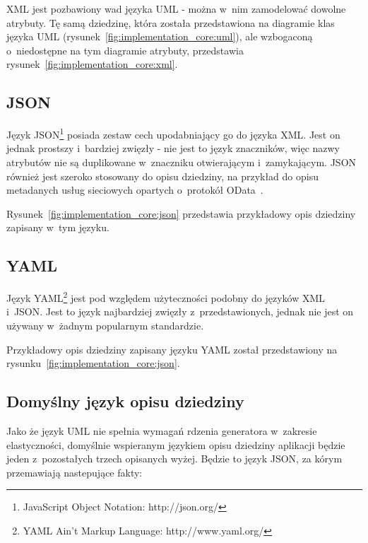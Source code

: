 XML jest pozbawiony wad języka UML - można w~nim zamodelować dowolne atrybuty.
Tę samą dziedzinę, która została przedstawiona na diagramie klas języka UML (rysunek~\ref{fig:implementation_core:uml}), ale wzbogaconą o~niedostępne na tym diagramie atrybuty, przedstawia rysunek~\ref{fig:implementation_core:xml}.




\subsection{JSON}

Język JSON\footnote{JavaScript Object Notation: http://json.org/} posiada zestaw cech upodabniający go do języka XML.
Jest on jednak prostszy i~bardziej zwięzły - nie jest to język znaczników, więc nazwy atrybutów nie są duplikowane w~znaczniku otwierającym i~zamykającym.
JSON również jest szeroko stosowany do opisu dziedziny, na przykład do opisu metadanych usług sieciowych opartych o~protokół OData~\cite{odata}.

Rysunek~\ref{fig:implementation_core:json} przedstawia przykładowy opis dziedziny zapisany w~tym języku.




\subsection{YAML}

Język YAML\footnote{YAML Ain't Markup Language: http://www.yaml.org/} jest pod względem użyteczności podobny do języków XML i~JSON.
Jest to język najbardziej zwięzły z~przedstawionych, jednak nie jest on używany w~żadnym popularnym standardzie.

Przykładowy opis dziedziny zapisany języku YAML został przedstawiony na rysunku~\ref{fig:implementation_core:json}.




\subsection{Domyślny język opisu dziedziny}

Jako że język UML nie spełnia wymagań rdzenia generatora w~zakresie elastyczności, domyślnie wspieranym językiem opisu dziedziny aplikacji będzie jeden z~pozostałych trzech opisanych wyżej.
Będzie to język JSON, za kórym przemawiają nastepujące fakty:

